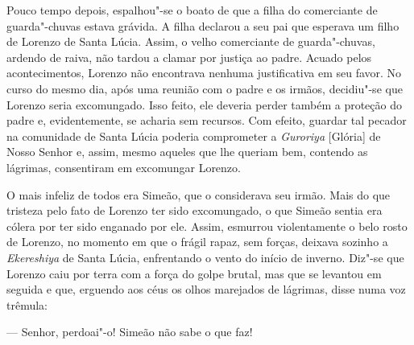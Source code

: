 Pouco tempo depois, espalhou"-se o boato de que a filha do comerciante de
guarda"-chuvas estava grávida. A filha declarou a seu pai que esperava
um filho de Lorenzo de Santa Lúcia. Assim, o velho comerciante de
guarda"-chuvas, ardendo de raiva, não tardou a clamar por justiça ao
padre. Acuado pelos acontecimentos, Lorenzo não encontrava nenhuma
justificativa em seu favor. No curso do mesmo dia, após uma reunião com
o padre e os irmãos, decidiu"-se que Lorenzo seria excomungado. Isso
feito, ele deveria perder também a proteção do padre e, evidentemente,
se acharia sem recursos. Com efeito, guardar tal pecador na comunidade
de Santa Lúcia poderia comprometer a \textit{Guroriya} [Glória] de
Nosso Senhor e, assim, mesmo aqueles que lhe queriam bem, contendo as
lágrimas, consentiram em excomungar Lorenzo.

O mais infeliz de todos era Simeão, que o considerava seu irmão. Mais do
que tristeza pelo fato de Lorenzo ter sido excomungado, o que Simeão
sentia era cólera por ter sido enganado por ele. Assim, esmurrou
violentamente o belo rosto de Lorenzo, no momento em que o frágil
rapaz, sem forças, deixava sozinho a \textit{Ekereshiya} de Santa
Lúcia, enfrentando o vento do início de inverno. Diz"-se que Lorenzo
caiu por terra com a força do golpe brutal, mas que se levantou em
seguida e que, erguendo aos céus os olhos marejados de lágrimas, disse
numa voz trêmula:

--- Senhor, perdoai"-o! Simeão não sabe o que faz!

